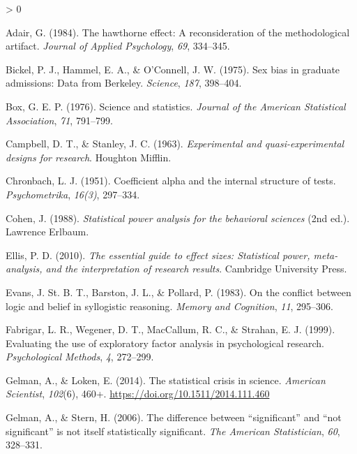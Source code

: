 \documentclass[
]{book}
\newlength{\cslhangindent}
\newenvironment{CSLReferences}[2] %
 {%
  \setlength{\parindent}{0pt}
  \ifodd #1 \everypar{\setlength{\hangindent}{\cslhangindent}}\ignorespaces\fi
  \ifnum #2 > 0
  \setlength{\parskip}{#2\baselineskip}
  \fi
 }%
 {}
\begin{document}
\hypertarget{refs}{}
\begin{CSLReferences}{1}{0}
\leavevmode\hypertarget{ref-Adair1984}{}%
Adair, G. (1984). The hawthorne effect: A reconsideration of the methodological artifact. \emph{Journal of Applied Psychology}, \emph{69}, 334--345.

\leavevmode\hypertarget{ref-Bickel1975}{}%
Bickel, P. J., Hammel, E. A., \& O'Connell, J. W. (1975). Sex bias in graduate admissions: Data from {B}erkeley. \emph{Science}, \emph{187}, 398--404.

\leavevmode\hypertarget{ref-Box1976}{}%
Box, G. E. P. (1976). Science and statistics. \emph{Journal of the American Statistical Association}, \emph{71}, 791--799.

\leavevmode\hypertarget{ref-Campbell1963}{}%
Campbell, D. T., \& Stanley, J. C. (1963). \emph{Experimental and quasi-experimental designs for research}. Houghton Mifflin.

\leavevmode\hypertarget{ref-Cronbach1951}{}%
Chronbach, L. J. (1951). Coefficient alpha and the internal structure of tests. \emph{Psychometrika}, \emph{16(3)}, 297--334.

\leavevmode\hypertarget{ref-Cohen1988}{}%
Cohen, J. (1988). \emph{Statistical power analysis for the behavioral sciences} (2nd ed.). Lawrence Erlbaum.

\leavevmode\hypertarget{ref-Ellis2010}{}%
Ellis, P. D. (2010). \emph{The essential guide to effect sizes: Statistical power, meta-analysis, and the interpretation of research results}. Cambridge University Press.

\leavevmode\hypertarget{ref-Evans1983}{}%
Evans, J. St. B. T., Barston, J. L., \& Pollard, P. (1983). On the conflict between logic and belief in syllogistic reasoning. \emph{Memory and Cognition}, \emph{11}, 295--306.

\leavevmode\hypertarget{ref-Fabrigar1999}{}%
Fabrigar, L. R., Wegener, D. T., MacCallum, R. C., \& Strahan, E. J. (1999). Evaluating the use of exploratory factor analysis in psychological research. \emph{Psychological Methods}, \emph{4}, 272--299.

\leavevmode\hypertarget{ref-Gelman2014}{}%
Gelman, A., \& Loken, E. (2014). {The statistical crisis in science}. \emph{American Scientist}, \emph{102}(6), 460+. \url{https://doi.org/10.1511/2014.111.460}

\leavevmode\hypertarget{ref-Gelman2006}{}%
Gelman, A., \& Stern, H. (2006). The difference between {``significant''} and {``not significant''} is not itself statistically significant. \emph{The American Statistician}, \emph{60}, 328--331.


\end{CSLReferences}
\end{document}
